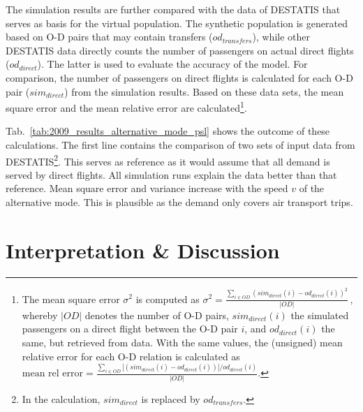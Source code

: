 The simulation results are further compared with the data of DESTATIS that serves as basis for the virtual population.  
The synthetic population is generated based on O-D pairs that may contain transfers ($od_{transfers}$), 
while other DESTATIS data directly counts the number of passengers on actual direct flights ($od_{direct}$). %
The latter is used to evaluate the accuracy of the model.
For comparison, the number of passengers on direct flights is calculated for each O-D pair ($sim_{direct}$) from the simulation results.
Based on these data sets, the mean square error and the mean relative error are calculated\footnote{
The mean square error $\sigma^2$ is computed as
	$\sigma^2 = \frac{\sum_{i \in OD} (sim_{direct}(i) - od_{direct}(i))^2}{|OD|} \, , $
whereby $|OD|$ denotes the number of O-D pairs, $sim_{direct}(i)$ the simulated passengers on a direct flight between the O-D pair $i$, and $od_{direct}(i)$ the same, but retrieved from data.  
With the same values, the (unsigned) mean relative error for each O-D relation is calculated as
$
\mbox{mean rel error} = \frac{\sum_{i \in OD} |(sim_{direct}(i) - od_{direct}(i))|/ od_{direct}(i)}{|OD|}.
$
}. 

Tab.~\ref{tab:2009_results_alternative_mode_psl} shows the outcome of these calculations. 
The first line contains the comparison of two sets of input data from DESTATIS\footnote{In the calculation, $sim_{direct}$ is replaced by $od_{transfers}$.}. 
This serves as reference as it would assume that all demand is served by direct flights.
All simulation runs explain the data better than that reference.
Mean square error and variance increase with the speed $v$ of the alternative mode.  
This is plausible as the demand only covers air transport trips. 


\section{Interpretation \& Discussion}
\label{sec:air_rail_discussion}

